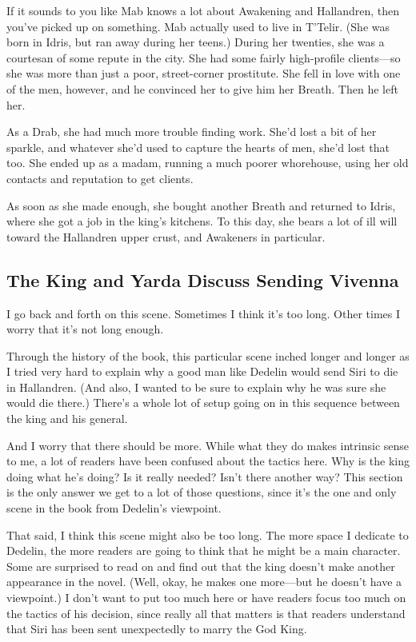 If it sounds to you like Mab knows a lot about Awakening and Hallandren, then you’ve picked up on something. Mab actually used to live in T’Telir. (She was born in Idris, but ran away during her teens.) During her twenties, she was a courtesan of some repute in the city. She had some fairly high-profile clients—so she was more than just a poor, street-corner prostitute. She fell in love with one of the men, however, and he convinced her to give him her Breath. Then he left her.

As a Drab, she had much more trouble finding work. She’d lost a bit of her sparkle, and whatever she’d used to capture the hearts of men, she’d lost that too. She ended up as a madam, running a much poorer whorehouse, using her old contacts and reputation to get clients.

As soon as she made enough, she bought another Breath and returned to Idris, where she got a job in the king’s kitchens. To this day, she bears a lot of ill will toward the Hallandren upper crust, and Awakeners in particular.

\subsection*{The King and Yarda Discuss Sending Vivenna}

I go back and forth on this scene. Sometimes I think it’s too long. Other times I worry that it’s not long enough.

Through the history of the book, this particular scene inched longer and longer as I tried very hard to explain why a good man like Dedelin would send Siri to die in Hallandren. (And also, I wanted to be sure to explain why he was sure she would die there.) There’s a whole lot of setup going on in this sequence between the king and his general.

And I worry that there should be more. While what they do makes intrinsic sense to me, a lot of readers have been confused about the tactics here. Why is the king doing what he’s doing? Is it really needed? Isn’t there another way? This section is the only answer we get to a lot of those questions, since it’s the one and only scene in the book from Dedelin’s viewpoint.

That said, I think this scene might also be too long. The more space I dedicate to Dedelin, the more readers are going to think that he might be a main character. Some are surprised to read on and find out that the king doesn’t make another appearance in the novel. (Well, okay, he makes one more—but he doesn’t have a viewpoint.) I don’t want to put too much here or have readers focus too much on the tactics of his decision, since really all that matters is that readers understand that Siri has been sent unexpectedly to marry the God King.

